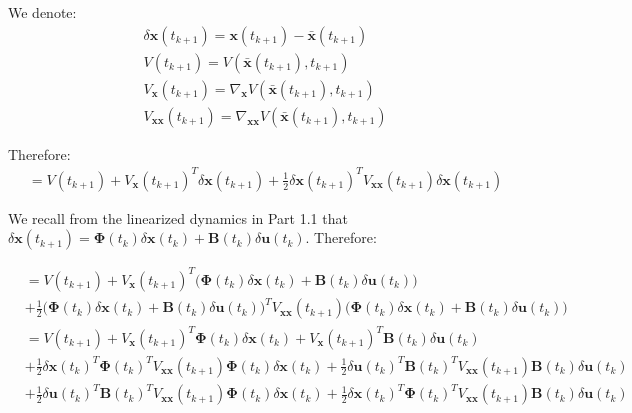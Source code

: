 \documentclass[11pt]{homework}
\renewcommand{\vec}[1]{\ensuremath{\boldsymbol{#1}}}
\begin{document}
\begin{arabicparts}
		We denote: 
			\begin{align*}
				& \delta\vec{x}(t_{k+1}) = \vec{x}(t_{k+1}) - \bar{\vec{x}}(t_{k+1}) \\
				& V(t_{k+1}) = V(\bar{\vec{x}}(t_{k+1}), t_{k+1})\\
				& V_{\vec{x}}(t_{k+1}) = \nabla_{\vec{x}}V(\bar{\vec{x}}(t_{k+1}), t_{k+1}) \\
				& V_{\vec{xx}}(t_{k+1}) = \nabla_{\vec{xx}}V(\bar{\vec{x}}(t_{k+1}), t_{k+1})
			\end{align*}
		
		Therefore: 
			\begin{align*}
				&  = V(t_{k+1}) + V_{\vec{x}}(t_{k+1})^{T}\delta\vec{x}(t_{k+1}) + \frac{1}{2}\delta\vec{x}(t_{k+1})^TV_{\vec{xx}}(t_{k+1})\delta\vec{x}(t_{k+1})
			\end{align*}
	
		We recall from the linearized dynamics in Part 1.1 that $\delta \vec{x}(t_{k+1}) =  \vec{\Phi}(t_{k})\delta\vec{x}(t_{k}) + \vec{B}(t_{k})\delta\vec{u}(t_{k})$. Therefore:
		
			\begin{align*}
				&  = V(t_{k+1}) + V_{\vec{x}}(t_{k+1})^{T}\Big(\vec{\Phi}(t_{k})\delta\vec{x}(t_{k}) + \vec{B}(t_{k})\delta\vec{u}(t_{k})\Big) \\
				& + \frac{1}{2}\Big(\vec{\Phi}(t_{k})\delta\vec{x}(t_{k}) + \vec{B}(t_{k})\delta\vec{u}(t_{k})\Big)^TV_{\vec{xx}}(t_{k+1})\Big(\vec{\Phi}(t_{k})\delta\vec{x}(t_{k}) + \vec{B}(t_{k})\delta\vec{u}(t_{k})\Big) \\
				& = V(t_{k+1}) + V_{\vec{x}}(t_{k+1})^{T}\vec{\Phi}(t_{k})\delta\vec{x}(t_{k}) +  V_{\vec{x}}(t_{k+1})^{T}\vec{B}(t_{k})\delta\vec{u}(t_{k}) \\
				& + \frac{1}{2}\delta\vec{x}(t_{k})^{T}\vec{\Phi}(t_{k})^{T}V_{\vec{xx}}(t_{k+1})\vec{\Phi}(t_{k})\delta\vec{x}(t_{k}) + \frac{1}{2}\delta\vec{u}(t_{k})^{T}\vec{B}(t_{k})^{T}V_{\vec{xx}}(t_{k+1})\vec{B}(t_{k})\delta\vec{u}(t_{k}) \\
				& + \frac{1}{2}\delta\vec{u}(t_{k})^{T}\vec{B}(t_{k})^{T}V_{\vec{xx}}(t_{k+1})\vec{\Phi}(t_{k})\delta\vec{x}(t_{k}) + \frac{1}{2}\delta\vec{x}(t_{k})^{T}\vec{\Phi}(t_{k})^{T}V_{\vec{xx}}(t_{k+1})\vec{B}(t_{k})\delta\vec{u}(t_{k})
			\end{align*}
		

\end{arabicparts}
\end{document}
